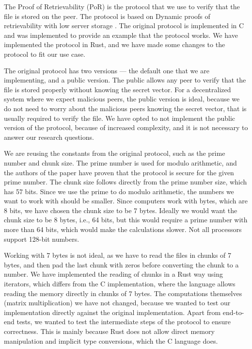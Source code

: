 The Proof of Retrievability (PoR) is the protocol that we use to verify that the file is stored on the peer.
The protocol is based on Dynamic proofs of retrievability with low server storage \cite{poralgebra}.
The original protocol is implemented in C and was implemented to provide an example that the protocol works.
We have implemented the protocol in Rust, and we have made some changes to the protocol to fit our use case.

The original protocol has two versions --- the default one that we are implementing, and a public version.
The public allows any peer to verify that the file is stored properly without knowing the secret vector.
For a decentralized system where we expect malicious peers, the public version is ideal,
because we do not need to worry about the malicious peers knowing the secret vector,
that is usually required to verify the file.
We have opted to not implement the public version of the protocol,
because of increased complexity, and it is not necessary to answer our research questions.

We are reusing the constants from the original protocol,
such as the prime number and chunk size.
The prime number is used for modulo arithmetic, and the authors of the paper have proven
that the protocol is secure for the given prime number.
The chunk size follows directly from the prime number size, which has 57 bits.
Since we use the prime to do modulo arithmetic, the numbers we want to work with
should be smaller.
Since computers work with bytes, which are 8 bits, we have chosen the chunk size to be 7 bytes.
Ideally we would want the chunk size to be 8 bytes, i.e., 64 bits, but this would require a prime number
with more than 64 bits, which would make the calculations slower.
Not all processors support 128-bit numbers.

Working with 7 bytes is not ideal, as we have to read the files in chunks of 7 bytes,
and then pad the last chunk with zeros before converting the chunk to a number.
We have implemented the reading of chunks in a Rust way using iterators,
which differs from the C implementation, where the language allows reading the memory directly in
chunks of 7 bytes.
The computations themselves (matrix multiplication) we have not changed,
because we wanted to test our implementation directly against the original implementation.
Apart from end-to-end tests, we wanted to test the intermediate steps of the protocol
to ensure correctness.
This is mainly because Rust does not allow direct memory manipulation and implicit type conversions,
which the C language does.

